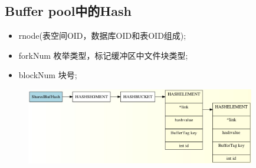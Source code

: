 \documentclass{article}
\begin{document}
\begin{CJK*}{UTF8}{gkai}
\section{Buffer pool中的Hash} 

\begin{itemize}
\item \quad rnode(表空间OID，数据库OID和表OID组成);\\
\item \quad forkNum 枚举类型，标记缓冲区中文件块类型;\\
\item \quad blockNum  块号;
\end{itemize}

\begin{figure}[!ht]
\centering
\includegraphics[width = 100mm]{buf.jpg}
\caption{}
\label{overflow}
\end{figure}



\end{CJK*}
\end{document}
